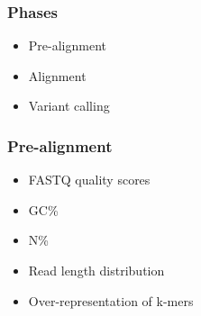 \documentclass[slidestop,14pt]{beamer}
\begin{document}

\begin{frame}
  \frametitle{Phases}

  \vspace{\baselineskip}

  \begin{itemize}
    \item Pre-alignment
    \item Alignment
    \item Variant calling
  \end{itemize}
\end{frame}

\begin{frame}
  \frametitle{Pre-alignment}

  \vspace{\baselineskip}

  \begin{itemize}
    \item FASTQ quality scores
    \item GC\%
    \item N\%
    \item Read length distribution
    \item Over-representation of k-mers
  \end{itemize}

\end{frame}

{
  \frame{}
}
\end{document}
